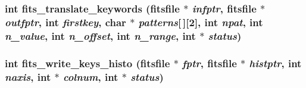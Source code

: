 \subsubsection{\setlength{\rightskip}{0pt plus 5cm}int fits\_\-translate\_\-keywords (\bf{fitsfile} $\ast$ {\em infptr}, \bf{fitsfile} $\ast$ {\em outfptr}, int {\em firstkey}, char $\ast$ {\em patterns}[$\,$][2], int {\em npat}, int {\em n\_\-value}, int {\em n\_\-offset}, int {\em n\_\-range}, int $\ast$ {\em status})}\label{fitsio_8h_2895ae781125419a386901494196d211}


\subsubsection{\setlength{\rightskip}{0pt plus 5cm}int fits\_\-write\_\-keys\_\-histo (\bf{fitsfile} $\ast$ {\em fptr}, \bf{fitsfile} $\ast$ {\em histptr}, int {\em naxis}, int $\ast$ {\em colnum}, int $\ast$ {\em status})}\label{fitsio_8h_70c980ef136c4ca7cb97f1e107f03458}


